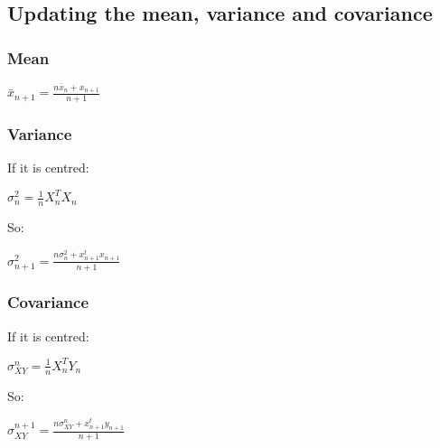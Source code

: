 
\subsection{Updating the mean, variance and covariance}

\subsubsection{Mean}

\(\bar x_{n+1} = \frac{n\bar x_n+x_{n+1}}{n+1}\)

\subsubsection{Variance}

If it is centred:

\(\sigma_n^2=\frac{1}{n}X_n^TX_n\)

So:

\(\sigma_{n+1}^2=\frac{n\sigma_n^2 +x_{n+1}^tx_{n+1}}{n+1}\)

\subsubsection{Covariance}

If it is centred:

\(\sigma_{XY}^n=\frac{1}{n}X_n^TY_n\)

So:

\(\sigma_{XY}^{n+1}=\frac{n\sigma^n_{XY}+x_{n+1}^ty_{n+1}}{n+1}\)


